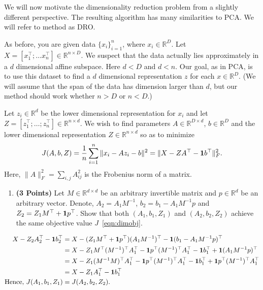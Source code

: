\documentclass[a4paper]{article}
\newcounter{thm}
\newcommand*{\one}{{\bf 1}}
\theoremstyle{definition}
\newcommand{\RR}{\mathbb{R}}
\newenvironment{soln}{
    \leavevmode\color{blue}\ignorespaces
}{}
\begin{document}
We will now motivate the dimensionality reduction problem from a slightly different
perspective. The resulting algorithm has many similarities to PCA.
We will refer to method as DRO.

As before, you are given data $\{x_i\}_{i=1}^n$, where $x_i \in \RR^D$. Let $X=[x_1^\top; \dots
x_n^\top] \in \RR^{n\times D}$. We suspect that the data
actually lies approximately in  a $d$ dimensional affine subspace.
Here $d<D$ and $d<n$.
Our goal, as in PCA, is to use this dataset to find a $d$ dimensional representation $z$ for each $x\in\RR^D$.
(We will assume that the span of the data has dimension larger than
$d$, but our method should work whether $n>D$ or $n<D$.)


Let $z_i\in \RR^d$ be the lower dimensional representation for $x_i$ and
let $Z = [z_1^\top; \dots; z_n^\top] \in \RR^{n\times d}$.
We wish to find parameters $A \in \RR^{D\times d}$, $b\in\RR^D$ and the lower
dimensional representation $Z\in \RR^{n\times d}$ so as to minimize 
\begin{equation}
J(A,b,Z) = \frac{1}{n} \sum_{i=1}^n \|x_i - Az_i - b\|^2 = \| X - ZA^\top - \one b^\top\|_F^2.
\label{eqn:dimobj}
\end{equation}
Here, $\|A\|^2_F = \sum_{i,j} A_{ij}^2$ is the Frobenius norm of a matrix.


\begin{enumerate}
\item \textbf{(3 Points)}
Let $M\in\RR^{d\times d}$ be an arbitrary invertible matrix and $p\in\RR^{d}$ be an arbitrary vector.
Denote, $A_2 = A_1M^{-1}$, $b_2 = b_1- A_1M^{-1}p$ and $Z_2 = Z_1 M^\top +
\one p^\top$.
Show that both
$(A_1, b_1, Z_1)$ and $(A_2, b_2, Z_2)$ achieve the same objective value $J$~\eqref{eqn:dimobj}.
\end{enumerate}

\begin{soln}
    \begin{align*}
        X - Z_2 A_2^\top - \one b_2^\top &= X - (Z_1 M^\top + \one p^\top) (A_1 M^{-1})^\top - \one (b_1 - A_1 M^{-1} p)^\top \\
        &= X - Z_1 M^\top (M^{-1})^\top A_1^\top - \one p^\top (M^{-1})^\top A_1^\top - \one b_1^\top + \one (A_1 M^{-1} p)^\top \\
        &= X - Z_1 (M^{-1}M)^\top A_1^\top - \one p^\top (M^{-1})^\top A_1^\top - \one b_1^\top + \one p^\top (M^{-1})^\top A_1^\top \\
        &= X - Z_1 A_1^\top - \one b_1^\top \\
        \text{Hence, } J(A_1, b_1, Z_1) &= J(A_2, b_2, Z_2).
    \end{align*}
\end{soln}
\end{document}
